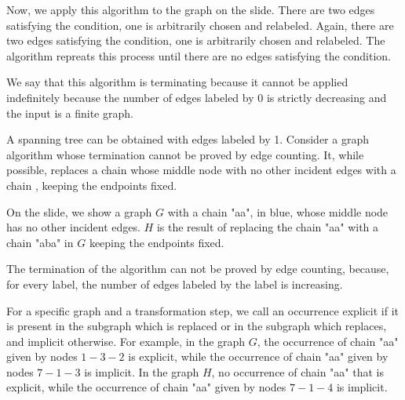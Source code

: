     Now, we apply this algorithm to the graph on the slide.
    There are two edges satisfying the condition, one is arbitrarily chosen and relabeled. Again, there are two edges satisfying the condition, one is arbitrarily chosen and relabeled. The algorithm repreats this process until there are no edges satisfying the condition.

    We say that this algorithm is terminating because it cannot be applied indefinitely because the number of edges labeled by 0 is strictly decreasing and the input is a finite graph.

    A spanning tree can be obtained with edges labeled by 1.
Consider a graph algorithm whose termination cannot be proved by edge counting.
 It, while possible, replaces a chain  whose middle node with no other incident edges with a chain , keeping the endpoints fixed.

    On the slide, we show a graph $G$ with a chain "aa", in blue, whose middle node has no other incident edges. $H$ is the result of replacing the chain "aa" with a chain "aba" in $G$ keeping the endpoints fixed.

        The termination of the algorithm can not be proved by edge counting, because, for every label, the number of edges labeled by the label is increasing.

        For a specific graph and a transformation step, we call an occurrence explicit if it is present in the subgraph which is replaced or in the subgraph which replaces, and implicit otherwise. For example, in the graph $G$, the occurrence of chain "aa" given by nodes $1-3-2$ is explicit, while the occurrence of chain "aa" given by nodes $7-1-3$ is implicit. In the graph $H$, no occurrence of chain "aa" that is explicit, while the occurrence of chain "aa" given by nodes $7-1-4$ is implicit.
        
